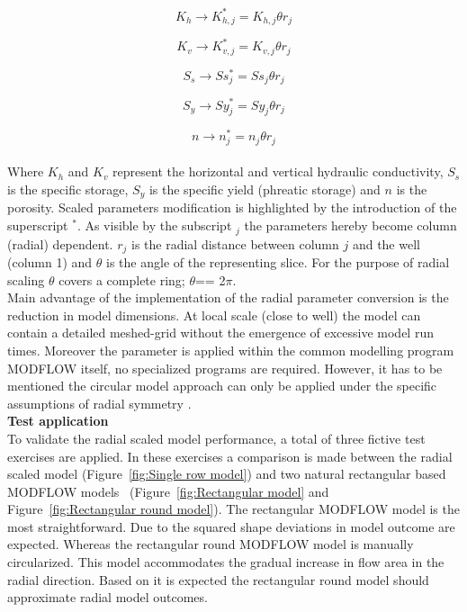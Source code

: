 \begin{equation}
 K_{h}  \rightarrow K_{h,j}^{*} =  K_{h,j} \theta r_{j}
\end{equation}

\begin{equation}
 K_{v}  \rightarrow K_{v,j}^{*} = K_{v,j} \theta r_{j} 
\end{equation}

\begin{equation}
 S_{s}  \rightarrow Ss_{j}^{*} = Ss_{j} \theta r_{j} 
\end{equation}

\begin{equation}
 S_{y}  \rightarrow Sy_{j}^{*} = Sy_{j} \theta r_{j} 
\end{equation}

\begin{equation}
 n   \rightarrow n_{j}^{*} = n_{j} \theta r_{j} 
\end{equation}
\\
Where $K_h$ and $K_v$ represent the horizontal and vertical hydraulic conductivity, $S_s$ is the specific storage, $S_y$ is the specific yield (phreatic storage) and $n$ is the porosity. Scaled parameters modification is highlighted by the introduction of the superscript $^*$. As visible by the subscript $_j$ the parameters hereby become column (radial) dependent. $r_j$ is the radial distance between column $j$ and the well (column 1) and $\theta$ is the angle of the representing slice. For the purpose of radial scaling $\theta$ covers a complete ring; $\theta$== 2$\pi$.
\bigskip \\ 
Main advantage of the implementation of the radial parameter conversion is the reduction in model dimensions. At local scale (close to well) the model can contain a detailed meshed-grid without the emergence of excessive model run times. Moreover the parameter is applied within the common modelling program MODFLOW itself, no specialized programs are required. However, it has to be mentioned the circular model approach can only be applied under the specific assumptions of radial symmetry \citep{Langevin2008}.  
\bigskip \\
\textbf{Test application}\\
To validate the radial scaled model performance, a total of three fictive test exercises are applied. In these exercises a comparison is made between the radial scaled model (Figure~\ref{fig:Single row model}) and two natural rectangular based MODFLOW models \ (Figure~\ref{fig:Rectangular model} and Figure~\ref{fig:Rectangular round model}). The rectangular MODFLOW model is the most straightforward. Due to the squared shape deviations in model outcome are expected. Whereas the rectangular round MODFLOW model is manually circularized. This model accommodates the gradual increase in flow area in the radial direction. Based on \citet{Langevin2008} it is expected the rectangular round model should approximate radial model outcomes. 

